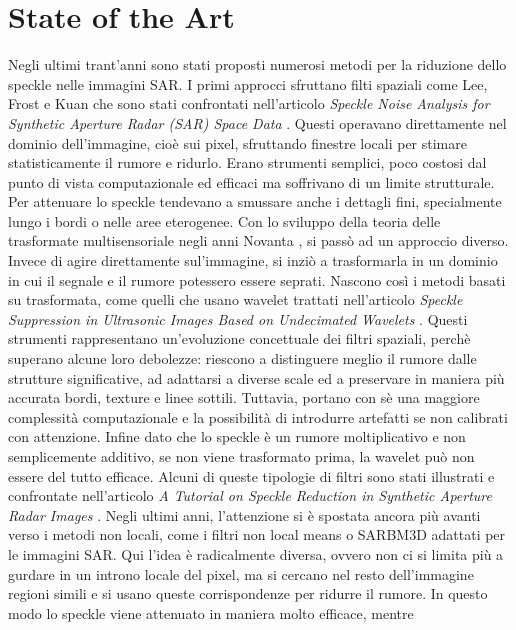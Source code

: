 
\chapter{State of the Art}
Negli ultimi trant'anni sono stati proposti numerosi metodi per la riduzione dello speckle nelle immagini SAR.
 I primi approcci sfruttano filti spaziali come Lee, Frost e Kuan che sono stati confrontati nell'articolo \textit{Speckle Noise Analysis for Synthetic Aperture Radar (SAR) Space Data} \cite{r2024specklenoiseanalysissynthetic}.
Questi operavano direttamente nel dominio dell'immagine, cioè sui pixel, sfruttando finestre locali per stimare
 statisticamente il rumore e ridurlo. Erano strumenti semplici, poco costosi dal punto 
di vista computazionale ed efficaci ma soffrivano di un limite strutturale. Per attenuare lo speckle tendevano a 
smussare anche i dettagli fini, specialmente lungo i bordi o nelle aree eterogenee. 
Con lo sviluppo della teoria delle trasformate multisensoriale negli anni Novanta , si passò ad un approccio diverso. 
Invece di agire direttamente sul'immagine, si inziò a trasformarla in un dominio 
in cui il segnale e il rumore potessero essere seprati. Nascono così i metodi basati su trasformata, come quelli che 
usano wavelet trattati nell'articolo \textit{Speckle Suppression in Ultrasonic Images Based on Undecimated Wavelets} \cite{Argenti2003}  . Questi strumenti rappresentano un'evoluzione concettuale dei filtri spaziali,
perchè superano alcune loro debolezze: riescono a distinguere meglio il rumore dalle strutture significative, ad 
adattarsi a diverse scale ed a preservare in maniera più accurata bordi, texture e linee sottili. 
Tuttavia, portano con sè una maggiore complessità computazionale e la possibilità di introdurre artefatti se non 
calibrati con attenzione. Infine dato che lo speckle è un rumore moltiplicativo e non semplicemente 
additivo, se non viene trasformato prima, la wavelet può non essere del tutto efficace. 
Alcuni di queste tipologie di filtri sono stati illustrati e confrontate nell'articolo \textit{A Tutorial on Speckle
Reduction in Synthetic Aperture Radar Images}  \cite{tutorSpeckle}.
Negli ultimi anni, l'attenzione si è spostata ancora più avanti verso i metodi non locali, come i filtri non local means o 
SARBM3D adattati per le immagini SAR. Qui l'idea è radicalmente diversa, ovvero non ci si limita più a gurdare in un 
introno locale del pixel, ma si cercano nel resto dell'immagine regioni simili e si usano queste 
corrispondenze per ridurre il rumore. In questo modo lo speckle viene attenuato in maniera molto efficace, mentre 
